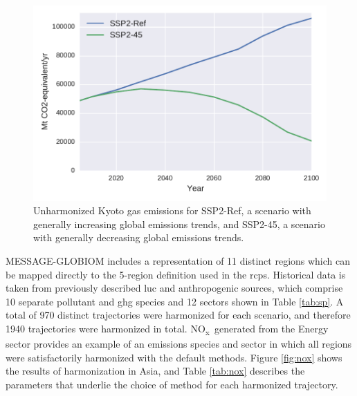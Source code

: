 \documentclass[review]{elsarticle}
\newcommand{\noxx}{NO\textsubscript{x}~}
\begin{document}
\begin{figure}
  \begin{center}
    \includegraphics[width=\textwidth]{results_kyoto.pdf}
    \caption[]{
      \label{fig:kyoto}
      Unharmonized Kyoto gas emissions for SSP2-Ref, a scenario with generally
      increasing global emissions trends, and SSP2-45, a scenario with generally
      decreasing global emissions trends.  }
  \end{center}
\end{figure}


MESSAGE-GLOBIOM includes a representation of 11 distinct regions which can be
mapped directly to the 5-region definition used in the \glspl{rcp}. Historical data is
taken from previously described \gls{luc} and anthropogenic sources, which comprise 10
separate pollutant and \gls{ghg} species and 12 sectors shown in Table \ref{tab:sp}. A
total of 970 distinct trajectories were harmonized for each scenario, and
therefore 1940 trajectories were harmonized in total. \noxx generated from the
Energy sector provides an example of an emissions species and sector in which
all regions were satisfactorily harmonized with the default methods. Figure
\ref{fig:nox} shows the results of harmonization in Asia, and Table
\ref{tab:nox} describes the parameters that underlie the choice of method for
each harmonized trajectory.
\end{document}
